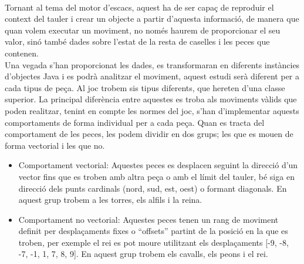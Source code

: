 \\[3mm]
Tornant al tema del motor d'escacs, aquest ha de ser capaç de reproduir el context del tauler i crear un objecte a partir d'aquesta informació, de manera que quan volem executar un moviment, no només haurem de proporcionar el seu valor, sinó també dades sobre l'estat de la resta de caselles i les peces que contenen.
\\[3mm]
Una vegada s'han proporcionat les dades, es transformaran en diferents instàncies d'objectes Java i es podrà analitzar el moviment, aquest estudi serà diferent per a cada tipus de peça. Al joc trobem sis tipus diferents, que hereten d’una classe superior. La principal diferència entre aquestes es troba als moviments vàlids que poden realitzar, tenint en compte les normes del joc, s’han d’implementar aquests comportaments de forma individual per a cada peça. Quan es tracta del comportament de les peces, les podem dividir en dos grups; les que es mouen de forma vectorial i les que no.
\begin{itemize}
    \item Comportament vectorial: Aquestes peces es desplacen seguint la direcció d’un vector fins que es troben amb altra peça o amb el límit del tauler, bé siga en direcció dels punts cardinals (nord, sud, est, oest) o formant diagonals. En aquest grup trobem a les torres, els alfils i la reina.
    \item Comportament no vectorial: Aquestes peces tenen un rang de moviment definit per desplaçaments fixes o “offsets” partint de la posició en la que es troben, per exemple el rei es pot moure utilitzant els desplaçaments [-9, -8, -7, -1, 1, 7, 8, 9]. En aquest grup trobem els cavalls, els peons i el rei.
\end{itemize}
